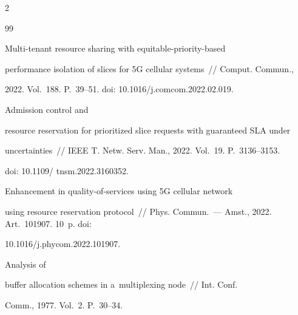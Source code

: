 \begin{multicols}{2}
{{\begin{thebibliography}{99}


 Multi-tenant resource sharing with equitable-priority-based 


performance isolation of slices for 5G cellular systems~// Comput. Commun., 


2022. Vol.~188. P.~39--51. doi: 10.1016/j.comcom.2022.02.019.













 Admission control and 


resource reservation for prioritized slice requests with guaranteed SLA under 


uncertainties~// IEEE T. Netw. Serv. Man., 2022. Vol.~19. P.~3136--3153. 


doi: 10.1109/ tnsm.2022.3160352.









Enhancement in quality-of-services using 5G cellular network 


using resource reservation protocol~// Phys. Commun.~--- Amst., 2022. Art.~101907. 10~p. doi: 


10.1016/j.phycom.2022.101907.

























 Analysis of 


buffer allocation schemes in a~multiplexing node~// Int. Conf. 


Comm., 1977. Vol.~2. P.~30--34.






\end{thebibliography}}}
\end{multicols}

